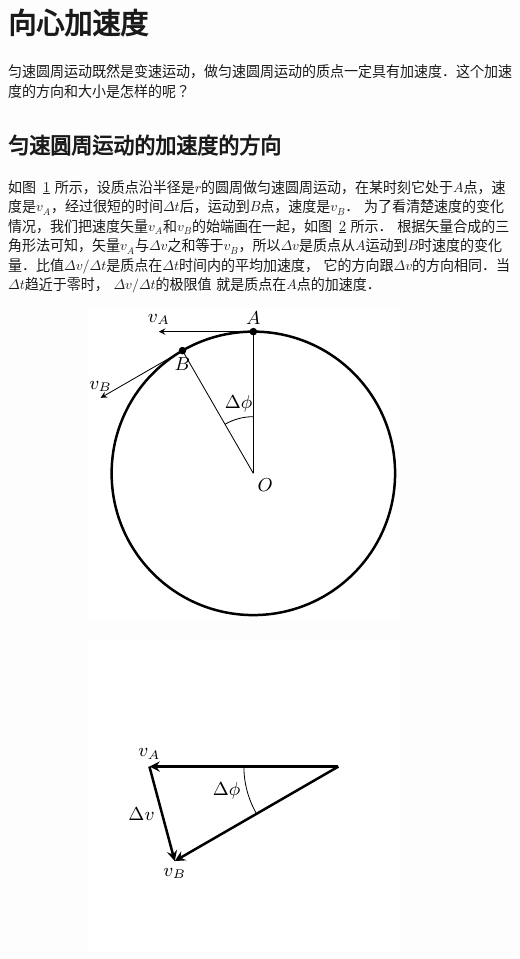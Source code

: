 \section{向心加速度}
匀速圆周运动既然是变速运动，做匀速圆周运动的质点一定具有加速度．这个加速度的方向和大小是怎样的呢？

\subsection{匀速圆周运动的加速度的方向} 

如图~\ref{fig_A_4-18a} 所示，设质点沿半径是$r$的圆周做匀速圆周运动，在某时刻它处于$A$点，速度是$v_A$，经过很短的时间$\Delta t$后，运动到$B$点，速度是$v_B$．
为了看清楚速度的变化情况，我们把速度矢量$v_A$和$v_B$的始端画在一起，如图~\ref{fig_A_4-18b} 所示．
根据矢量合成的三角形法可知，矢量$v_A$与$\Delta v$之和等于$v_B$，所以$\Delta v$是质点从$A$运动到$B$时速度的变化量．比值$\Delta v/\Delta t$是质点在$\Delta t$时间内的平均加速度，
它的方向跟$\Delta v$的方向相同．当$\Delta t$趋近于零时，
$\Delta v/\Delta t$的极限值
就是质点在$A$点的加速度．


\begin{figure}[htbp]
	\centering
	\begin{subfigure} {0.4\linewidth} 
		\centering
		\includegraphics{fig/A/4-18a.pdf} 
		\caption{}\label{fig_A_4-18a} 
	\end{subfigure}
	\hfil
	\begin{subfigure} {0.4\linewidth} 
		\centering
		\includegraphics{fig/A/4-18b.pdf} 
		\caption{}\label{fig_A_4-18b} 
	\end{subfigure}
	\caption{}\label{fig_A_4-18}
\end{figure}



